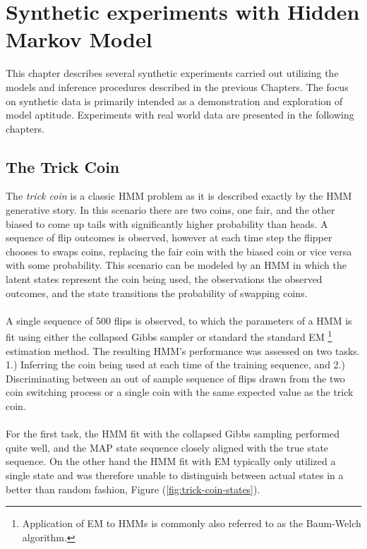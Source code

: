 \documentclass[12pt]{report}
\newcommand{\1}[0]{\mathbbm{1}}
\begin{document}
\chapter{Synthetic experiments with Hidden Markov Model}
This chapter describes several synthetic experiments carried out utilizing the models and
inference procedures described in the previous Chapters. The focus on synthetic data
is primarily intended as a demonstration and exploration of model aptitude. Experiments
with real world data are presented in the following chapters.

\section{The Trick Coin}
The \emph{trick coin} is a classic \ac{HMM} problem as it is described exactly
by the \ac{HMM} generative story. In this scenario there are two coins, one fair,
and the other biased to come up tails with significantly higher probability than heads. 
A sequence of flip outcomes is observed, however at each time step the flipper chooses
to swaps coins, replacing the fair coin with the biased coin or vice versa with some probability. 
This scenario can be modeled by an \ac{HMM} in which the latent
states represent the coin being used, the observations the observed outcomes, and
the state transitions the probability of swapping coins.
\\\\
A single sequence of 500 flips is observed, to which the parameters of a \ac{HMM} is fit using 
either the collapsed Gibbs sampler or standard the standard \ac{EM}
\footnote{Application of \ac{EM} to \acp{HMM} is commonly also referred to as 
the Baum-Welch algorithm.} 
estimation method. 
The resulting \ac{HMM}'s performance was assessed on two tasks. 1.) Inferring
the coin being used at each time of the training sequence, and 2.) Discriminating between an
out of sample sequence of flips drawn from the two coin switching process or a single coin with the 
same expected value as the trick coin.
\\\\
For the first task, the \ac{HMM} fit with the collapsed Gibbs sampling performed quite well,
and the \ac{MAP} state sequence closely aligned with the true state sequence. 
On the other hand the \ac{HMM} fit with \ac{EM} typically only utilized a single state 
and was therefore unable to distinguish between actual states in a better than random fashion,
Figure (\ref{fig:trick-coin-states}).
\end{document}

